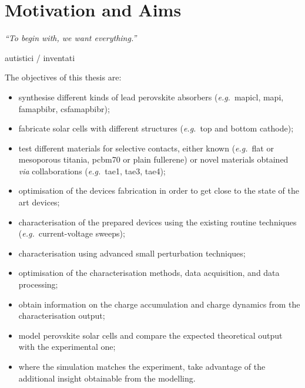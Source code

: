 
	\newpage

\section{Motivation and Aims}\label{sec:aims}
	\epigraph{\textit{\enquote{To begin with, we want everything.}}}{autistici / inventati}


	The objectives of this thesis are:\nolinebreak
	\begin{itemize}
		\item synthesise different kinds of lead perovskite absorbers (\textsl{e.g.}\ \gls{mapicl}, \gls{mapi}, \gls{famapbibr}, \gls{csfamapbibr});
		\item fabricate solar cells with different structures (\textsl{e.g.}\ top and bottom cathode);
		\item test different materials for selective contacts, either known (\textsl{e.g.}\ flat or mesoporous titania, \gls{pcbm70} or plain fullerene) or novel materials obtained \textsl{via} collaborations (\textsl{e.g.}\ \gls{tae1}, \gls{tae3}, \gls{tae4});
		\item optimisation of the devices fabrication in order to get close to the state of the art devices;
		\item characterisation of the prepared devices using the existing routine techniques (\textsl{e.g.}\ current\hyp{}voltage sweeps);
		\item characterisation using advanced small perturbation techniques;
		\item optimisation of the characterisation methods, data acquisition, and data processing;
		\item obtain information on the charge accumulation and charge dynamics from the characterisation output;
		\item model perovskite solar cells and compare the expected theoretical output with the experimental one;
		\item where the simulation matches the experiment, take advantage of the additional insight obtainable from the modelling.
	\end{itemize}

